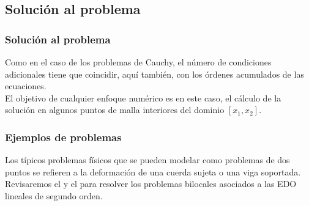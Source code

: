 \subsection*{Solución al problema}
\begin{frame}
\frametitle{Solución al problema}
Como en el caso de los problemas de Cauchy, el número de condiciones adicionales tiene que coincidir, aquí también, con los órdenes acumulados de las ecuaciones.
\\
\bigskip
El objetivo de cualquier enfoque numérico es en este caso, el cálculo de la solución en algunos puntos de malla interiores del dominio $[x_{1}, x_{2}]$.
\end{frame}
\begin{frame}
\frametitle{Ejemplos de problemas}
Los típicos problemas físicos que se pueden modelar como problemas de dos puntos se refieren a la deformación de una cuerda sujeta o una viga soportada.
\\
\bigskip
Revisaremos el  y el   para resolver los problemas bilocales asociados a las EDO lineales de segundo orden.
\end{frame}
